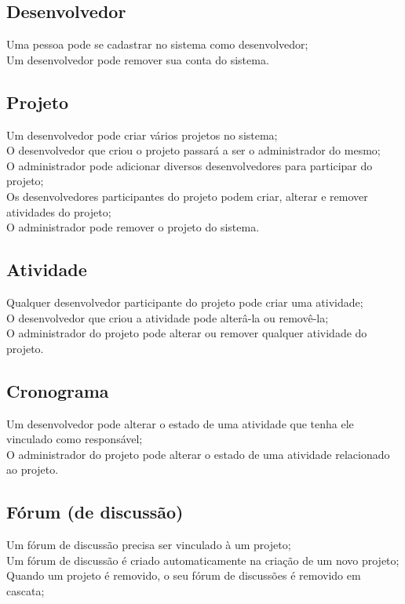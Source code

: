 \documentclass{article}
\begin{document}
	\subsection{Desenvolvedor}
	Uma pessoa pode se cadastrar no sistema como desenvolvedor;\\
	Um desenvolvedor pode remover sua conta do sistema.

	\subsection{Projeto}
	Um desenvolvedor pode criar vários projetos no sistema;\\
	O desenvolvedor que criou o projeto passará a ser o administrador do mesmo;\\
	O administrador pode adicionar diversos desenvolvedores para participar do projeto;\\
	Os desenvolvedores participantes do projeto podem criar, alterar e remover atividades do projeto;\\
	O administrador pode remover o projeto do sistema.

	\subsection{Atividade}
	Qualquer desenvolvedor participante do projeto pode criar uma atividade;\\
	O desenvolvedor que criou a atividade pode alterâ-la ou removê-la;\\
	O administrador do projeto pode alterar ou remover qualquer atividade do projeto.

	\subsection{Cronograma}
	Um desenvolvedor pode alterar o estado de uma atividade que tenha ele vinculado como responsável;\\
	O administrador do projeto pode alterar o estado de uma atividade relacionado ao projeto.\\

	\subsection{Fórum (de discussão)}
	Um fórum de discussão precisa ser vinculado à um projeto;\\
	Um fórum de discussão é criado automaticamente na criação de um novo projeto;\\
	Quando um projeto é removido, o seu fórum de discussões é removido em cascata;\\
\end{document}
